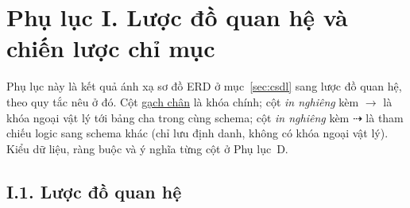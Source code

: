 
\section*{Phụ lục I. Lược đồ quan hệ và chiến lược chỉ mục}
\label{apdx:quanhe}

Phụ lục này là kết quả ánh xạ sơ đồ ERD ở mục~\ref{sec:csdl} sang lược đồ quan hệ, theo quy tắc nêu ở đó. Cột \underline{gạch chân} là khóa chính; cột \textit{in nghiêng} kèm $\rightarrow$ là khóa ngoại vật lý tới bảng cha trong cùng schema; cột \textit{in nghiêng} kèm $\dashrightarrow$ là tham chiếu logic sang schema khác (chỉ lưu định danh, không có khóa ngoại vật lý). Kiểu dữ liệu, ràng buộc và ý nghĩa từng cột ở Phụ lục~D.

\subsection*{I.1. Lược đồ quan hệ}

